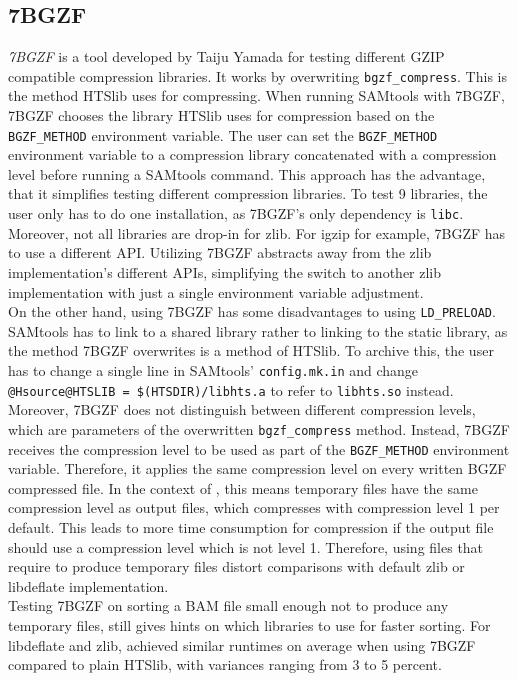 \subsection{7BGZF}
\textit{7BGZF} \cite{yamada_7bgzf_2020} is a tool developed by Taiju Yamada for testing different GZIP compatible compression libraries. It works by overwriting \texttt{bgzf\_compress}. This is the method HTSlib uses for compressing. When running SAMtools with 7BGZF, 7BGZF chooses the library HTSlib uses for compression based on the \texttt{BGZF\_METHOD} environment variable. The user can set the \texttt{BGZF\_METHOD} environment variable to a compression library concatenated with a compression level before running a SAMtools command. This approach has the advantage, that it simplifies testing different compression libraries. 
To test 9 libraries, the user only has to do one installation, as 7BGZF's only dependency is \texttt{libc}. Moreover, not all libraries are drop-in for zlib. For igzip for example, 7BGZF has to use a different API. Utilizing 7BGZF abstracts away from the zlib implementation's different APIs, simplifying the switch to another zlib implementation with just a single environment variable adjustment.
\\
On the other hand, using 7BGZF has some disadvantages to using \texttt{LD\_PRELOAD}. SAMtools has to link to a shared library rather to linking to the static library, as the method 7BGZF overwrites is a method of HTSlib. To archive this, the user has to change a single line in SAMtools' \texttt{config.mk.in} and change \texttt{@Hsource@HTSLIB = \$(HTSDIR)/libhts.a} to refer to \texttt{libhts.so} instead. \\
Moreover, 7BGZF does not distinguish between different compression levels, which are parameters of the overwritten \texttt{bgzf\_compress} method. Instead, 7BGZF receives the compression level to be used as part of the \texttt{BGZF\_METHOD} environment variable. Therefore, it applies the same compression level on every written BGZF compressed file. 
In the context of \sort, this means temporary files have the same compression level as output files, which \sort compresses with compression level 1 per default. This leads to more time consumption for compression if the output file should use a compression level which is not level 1. Therefore, using files that require \sort to produce temporary files distort comparisons with default zlib or libdeflate implementation. \\
Testing 7BGZF on sorting a BAM file small enough not to produce any temporary files, still gives hints on which libraries to use for faster sorting. For libdeflate and zlib, \sort achieved similar runtimes on average when using 7BGZF compared to plain HTSlib, with variances ranging from 3 to 5 percent. \\

